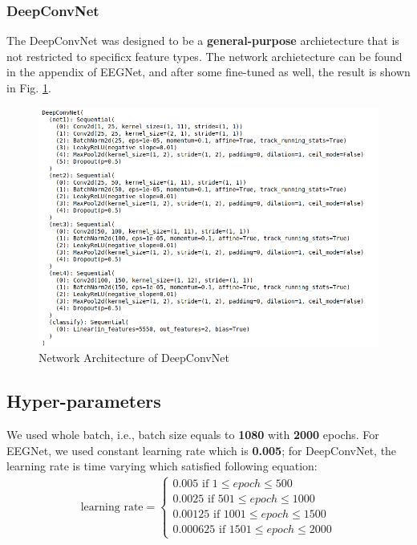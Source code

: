 \documentclass[12pt,a4paper]{article}
\begin{document}
\subsubsection{DeepConvNet}
The DeepConvNet was designed to be a \textbf{general-purpose} archietecture that is not restricted to specificx feature types. \cite{lawhern2018eegnet} The network archietecture can be found in the appendix of EEGNet, and after some fine-tuned as well, the result is shown in Fig. \ref{fig:dcn}.
\begin{figure}[hbt]
\centering
\includegraphics[scale=0.4]{dcn.png}
\caption{Network Architecture of DeepConvNet}
\label{fig:dcn}
\end{figure}

\subsection{Hyper-parameters}
We used whole batch, i.e., batch size equals to \textbf{1080} with \textbf{2000} epochs. For EEGNet, we used constant learning rate which is \textbf{0.005}; for DeepConvNet, the learning rate is time varying which satisfied following equation: 
\begin{align}
\text{learning rate}=
\left\{
  \begin{array}{ll}
  0.005 \text{    if $1 \leq epoch \leq 500$} \\
  0.0025  \text{   if $501 \leq epoch \leq 1000$} \\
  0.00125  \text{  if $1001 \leq epoch \leq 1500$} \\
  0.000625 \text{ if $1501 \leq epoch \leq 2000$} 
  \end{array}
  \right.
\end{align}
\end{document}
